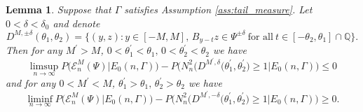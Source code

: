 \documentclass[10pt,a4paper]{amsart}
\newtheorem{lemma}{Lemma}
\newcommand{\QQ}{\mathbb{Q}}
\newcommand{\bbq}{\QQ}
\newcommand{\cE}{\mathcal{E}}
\newcommand{\problem}[1]{{\color{red}  {Problems: #1}}}
\begin{document}
\begin{lemma}\label{lemma:cluster_equi_pt}
Suppose that $\Gamma$  satisfies Assumption \ref{ass:tail_measure}. Let
$0<\delta<\delta_0$ and denote 
\[
  D^{M,\pm\delta}(\theta_1,\theta_2) = \bigl\{(y, z): y \in [-M, M],\, B_{y-t}z
  \in \Psi^{\pm \delta} \ \text{for all} \
  t \in [-\theta_2, \theta_1]\cap \bbq\bigr\}.
\] 
Then for any $M^\prime >M$, $   0<\theta_1^\prime<\theta_1, \,
0<\theta_2^\prime<\theta_2$ we have 
\begin{equation} \label{e:connect.N2}
  \limsup_{n\to \infty} P\bigl(\cE_n^M(\Psi) \big|E_0(n,\Gamma)\bigr)
    - P\bigl(N_n^2\bigl(D^{M^\prime,\delta}(\theta_1^\prime, \theta_2^\prime\bigr)
    \geq 1\big|E_0(n,\Gamma)\bigr) \leq 0 
  \end{equation}
and for any $0<M^\prime<M$, $   \theta_1^\prime>\theta_1, \,
\theta_2^\prime>\theta_2$ we have
\begin{equation} \label{e:connect.N2a}
  \liminf_{n\to \infty} P\bigl(\cE_n^M(\Psi) \big|E_0(n,\Gamma)\bigr)
    - P\bigl(N_n^2\bigl(D^{M^\prime,-\delta}(\theta_1^\prime, \theta_2^\prime\bigr)
    \geq 1\big|E_0(n,\Gamma)\bigr) \geq 0.  
  \end{equation}
\end{lemma}
\end{document}
